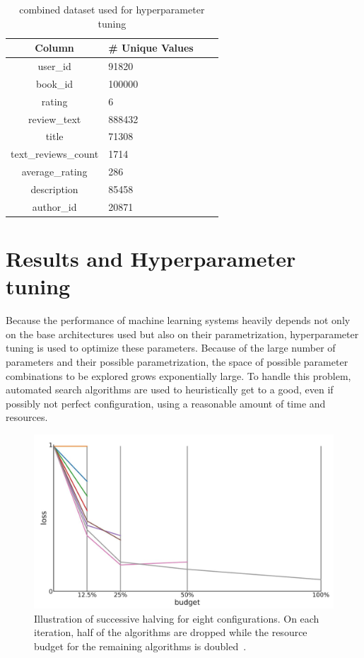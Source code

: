 \documentclass[10pt,final,journal,a4paper,oneside,twocolumn]{IEEEtran}
\begin{document}
\begin{table}[h]
    \centering
        \caption{combined dataset used for hyperparameter tuning}
        \begin{tabular}{clll}
                \toprule
                Column & \# Unique Values \\
                \midrule
                user\_id & 91820  \\
                book\_id & 100000\\
                rating & 6\\
                review\_text & 888432\\
                title & 71308 \\
                text\_reviews\_count & 1714 \\
                average\_rating & 286 \\
                description & 85458 \\
                author\_id & 20871 \\
                \bottomrule
        \end{tabular}
            \label{tab:used_data}
\end{table}
    
\section{Results and Hyperparameter tuning}
Because the performance of machine learning systems heavily depends not only on the base architectures used but also on their parametrization, hyperparameter tuning is used to optimize these parameters.
Because of the large number of parameters and their possible parametrization, the space of possible parameter combinations to be explored grows exponentially large. To handle this problem, automated search algorithms are used to heuristically get to a good, even if possibly not perfect configuration, using a reasonable amount of time and resources.

\begin{figure}[ht]
    \centering
    \includegraphics[width=\linewidth]{successive_halving}
    \caption{Illustration of successive halving for eight configurations. On each iteration, half of the algorithms are dropped while the resource budget for the remaining algorithms is doubled~\cite{Feurer.2019}.}
    \label{fig:succ_halving}
\end{figure}
\end{document}
